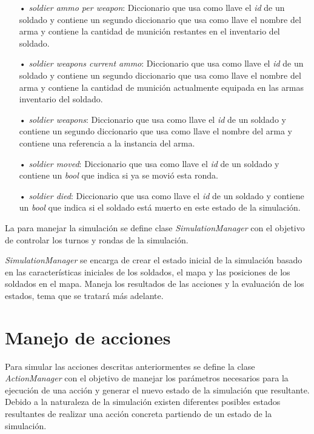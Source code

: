 \documentclass{llncs}
\begin{document}
\begin{itemize}
\item[•] \emph{soldier ammo per weapon}: Diccionario que usa como llave el \emph{id} de un soldado y contiene un segundo diccionario que usa como llave el nombre del arma y contiene la cantidad de munici\'on restantes en el inventario del soldado.
\item[•] \emph{soldier weapons current ammo}:  Diccionario que usa como llave el \emph{id} de un soldado y contiene un segundo diccionario que usa como llave el nombre del arma y contiene la cantidad de munici\'on actualmente equipada en las armas inventario del soldado.
\item[•] \emph{soldier weapons}: Diccionario que usa como llave el \emph{id} de un soldado y contiene un segundo diccionario que usa como llave el nombre del arma y contiene una referencia a la instancia del arma.
\item[•] \emph{soldier moved}: Diccionario que usa como llave el \emph{id} de un soldado y contiene un \emph{bool} que indica si ya se movi\'o esta ronda.
\item[•] \emph{soldier died}: Diccionario que usa como llave el \emph{id} de un soldado y contiene un \emph{bool} que indica si el soldado est\'a muerto en este estado de la simulaci\'on.

\end{itemize}

La para manejar la simulaci\'on se define clase \emph{SimulationManager} con el objetivo de controlar los turnos y rondas de la simulaci\'on.

\emph{SimulationManager} se encarga de crear el estado inicial de la simulaci\'on basado en las caracter\'isticas iniciales de los soldados, el mapa y las posiciones de los soldados en el mapa. Maneja los resultados de las acciones y la evaluaci\'on de los estados, tema que se tratar\'a m\'as adelante.


\section{Manejo de acciones}

Para simular las acciones descritas anteriormentes se define la clase \emph{ActionManager} con el objetivo de manejar los par\'ametros necesarios para la ejecuci\'on de una acci\'on y generar el nuevo estado de la simulaci\'on que resultante. Debido a la naturaleza de la simulaci\'on existen diferentes posibles estados resultantes de realizar una acci\'on concreta partiendo de un estado de la simulaci\'on.
\end{document}

